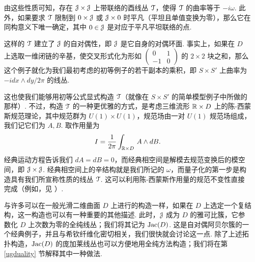 由这些性质可知，存在 ${\cal J}\times {\cal J}$ 上带联络的酉线丛 ${\cal T}$，使得 ${\cal T}$ 的曲率等于 $-i\omega$. 此外，如果要求 ${\cal T}$ 限制到 $0\times
{\cal J}$ 或 ${\cal J}\times 0$ 时平凡（平坦且单值变换为零），那么它在同构意义下唯一确定，其中 $0\in {\cal J}$ 是对应于平凡平坦联络的点.

这样的 ${\cal T}$ 建立了 ${\cal J}$ 的自对偶性，即 ${\cal J}$ 是它自身的对偶环面. 事实上，如果在 $D$ 上选取一维闭链的辛基，使交叉形式化为形如 $\begin{pmatrix}0
& 1\\ -1 & 0\end{pmatrix}$ 的 $2\times 2$ 块之和，那么这个例子就化为我们最初考虑的初等例子的若干副本的乘积，即 $S\times S'$ 上曲率为 $-idx\wedge dy/2\pi$ 的线丛.

这也使我们能够用初等公式显式构造 ${\cal T}$（就像在 $S\times S'$ 的简单模型例子中所做的那样）. 不过，构造 ${\cal T}$ 的一种更优雅的方式，是考虑三维流形 $\Bbb{R}\times D$ 上的陈-西蒙斯规范理论，其中规范群为 $U(1)\times U(1)$，规范场由一对 $U(1)$ 规范场组成，我们记它们为 $A,B$. 取作用量为
\begin{equation}
\label{ploko} I={1\over 2\pi}\int_{\Bbb{R}\times D}\,A\wedge dB.
\end{equation}
经典运动方程告诉我们 $dA=dB=0$，而经典相空间是解模去规范变换后的模空间，即 ${\cal J}\times {\cal J}$. 经典相空间上的辛结构就是我们所记的 $\omega$，而量子化的第一步是构造具有我们所宣称性质的线丛 ${\cal T}$. 这可以利用陈-西蒙斯作用量的规范不变性直接完成（例如，见 \cite{rsw,axelrod}）.

与许多可以在一般光滑二维曲面 $D$ 上进行的构造一样，如果在 $D$ 上选定一个复结构，这一构造也可以有一种重要的其他描述. 此时，${\cal J}$ 成为 $D$ 的雅可比簇，它参数化 $D$ 上次数为零的全纯线丛；我们将其记为 ${\rm Jac}(D)$. 这是自对偶阿贝尔簇的一个经典例子，并且与希钦纤维化密切相关，我们很快就会讨论这一点. 除了上述拓扑构造，${\rm Jac}(D)$ 的庞加莱线丛也可以方便地用全纯方法构造；我们将在第 \ref{ugduality} 节解释其中一种做法.

